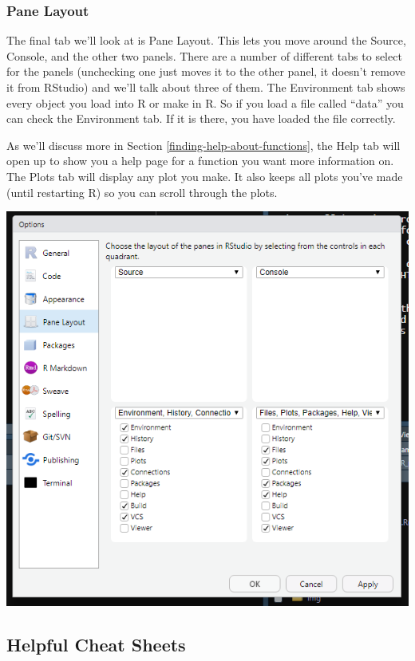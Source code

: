 \documentclass[
  12pt,
  openany]{book}
\begin{document}
\hypertarget{pane-layout}{%
\subsubsection{Pane Layout}\label{pane-layout}}

The final tab we'll look at is Pane Layout. This lets you move around the Source, Console, and the other two panels. There are a number of different tabs to select for the panels (unchecking one just moves it to the other panel, it doesn't remove it from RStudio) and we'll talk about three of them. The Environment tab shows every object you load into R or make in R. So if you load a file called ``data'' you can check the Environment tab. If it is there, you have loaded the file correctly.

As we'll discuss more in Section \ref{finding-help-about-functions}, the Help tab will open up to show you a help page for a function you want more information on. The Plots tab will display any plot you make. It also keeps all plots you've made (until restarting R) so you can scroll through the plots.

\includegraphics{images/rstudio_9.PNG}

\hypertarget{helpful-cheat-sheets}{%
\subsection{Helpful Cheat Sheets}\label{helpful-cheat-sheets}}
\end{document}
